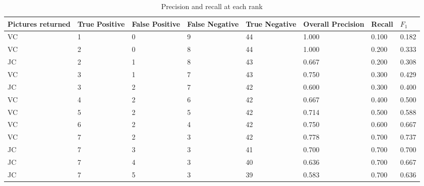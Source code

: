 \documentclass[fontsize=12pt, usenames, dvipsnames, headinclude, headsepline, footinclude, footsepline]{scrartcl}
\begin{document}
\begin{landscape}
\begin{table}[]
  \centering
  \caption{Precision and recall at each rank}
  \label{table:precision-recall}
  {\footnotesize
  \begin{tabular}{@{}llllllll@{}}
    \toprule
    Pictures returned & True Positive & False Positive & False Negative & True Negative & Overall Precision & Recall & $F_1$    \\ \midrule
    VC                & 1             & 0              & 9              & 44            & 1.000             & 0.100  & 0.182 \\
    VC                & 2             & 0              & 8              & 44            & 1.000             & 0.200  & 0.333 \\
    JC                & 2             & 1              & 8              & 43            & 0.667             & 0.200  & 0.308 \\
    VC                & 3             & 1              & 7              & 43            & 0.750             & 0.300  & 0.429 \\
    JC                & 3             & 2              & 7              & 42            & 0.600             & 0.300  & 0.400 \\
    VC                & 4             & 2              & 6              & 42            & 0.667             & 0.400  & 0.500 \\
    VC                & 5             & 2              & 5              & 42            & 0.714             & 0.500  & 0.588 \\
    VC                & 6             & 2              & 4              & 42            & 0.750             & 0.600  & 0.667 \\
    VC                & 7             & 2              & 3              & 42            & 0.778             & 0.700  & 0.737 \\
    JC                & 7             & 3              & 3              & 41            & 0.700             & 0.700  & 0.700 \\
    JC                & 7             & 4              & 3              & 40            & 0.636             & 0.700  & 0.667 \\
    JC                & 7             & 5              & 3              & 39            & 0.583             & 0.700  & 0.636 \\

\end{tabular}}
\end{table}
\end{landscape}
\end{document}
